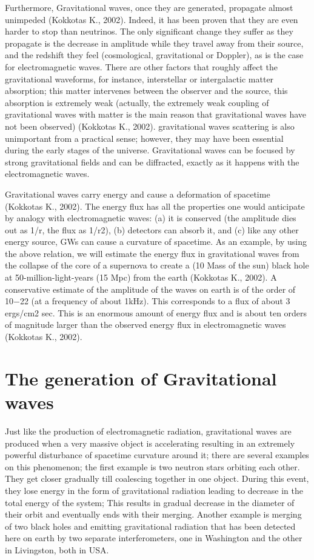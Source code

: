 \documentclass[11]{article}
\begin{document}
\vspace{5mm}
Furthermore, Gravitational waves, once they are generated, propagate almost unimpeded (Kokkotas K., 2002). Indeed, it has been proven that they are even harder to stop than neutrinos. The only significant change they suffer as they propagate is the decrease in amplitude while they travel away from their source, and the redshift they feel (cosmological, gravitational or Doppler), as is the case for electromagnetic waves. There are other factors that roughly affect the gravitational waveforms, for instance, interstellar or intergalactic matter absorption; this matter intervenes between the observer and the source, this absorption is extremely weak  (actually, the extremely weak coupling of gravitational waves with matter is the main reason that gravitational waves have not been observed) (Kokkotas K., 2002). gravitational waves scattering is also unimportant from a practical sense; however, they may have been essential during the early stages of the universe. Gravitational waves can be focused by strong gravitational fields and can be diffracted, exactly as it happens with the electromagnetic waves.

\vspace{5mm}
Gravitational waves carry energy and cause a deformation of spacetime (Kokkotas K., 2002). The energy flux has all the properties one would anticipate by analogy with electromagnetic waves: (a) it is conserved (the amplitude dies out as 1/r, the flux as 1/r2), (b) detectors can absorb it, and (c) like any other energy source, GWs can cause a curvature of spacetime. As an example, by using the above relation, we will estimate the energy flux in gravitational waves from the collapse of the core of a supernova to create a (10 Mass of the sun) black hole at 50-million-light-years (15 Mpc) from the earth (Kokkotas K., 2002). A conservative estimate of the amplitude of the waves on earth is of the order of 10−22 (at a frequency of about 1kHz). This corresponds to a flux of about 3 ergs/cm2 sec. This is an enormous amount of energy flux and is about ten orders of magnitude larger than the observed energy flux in electromagnetic waves (Kokkotas K., 2002).
\section{The generation of Gravitational waves}
Just like the production of electromagnetic radiation, gravitational waves are produced when a very massive object is accelerating resulting in an extremely powerful disturbance of spacetime curvature around it; there are several examples on this phenomenon; the first example is two neutron stars orbiting each other. They get closer gradually till coalescing together in one object. During this event, they lose energy in the form of gravitational radiation leading to decrease in the total energy of the system; This results in gradual decrease in the diameter of their orbit and eventually ends with their merging. Another example is merging of two black holes and emitting gravitational radiation that has been detected here on earth by two separate interferometers, one in Washington and the other in Livingston, both in USA.
\end{document}
